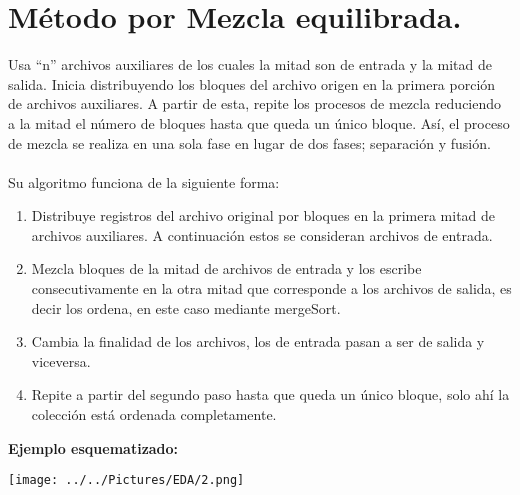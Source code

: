 \documentclass[12pt,letterpaper]{report}
\begin{document}
\section*{Método por Mezcla equilibrada.}
Usa “n” archivos auxiliares de los cuales la mitad son de entrada y la mitad de salida. Inicia distribuyendo los bloques del archivo origen en la primera porción de archivos auxiliares. A partir de esta, repite los procesos de mezcla reduciendo a la mitad el número de bloques hasta que queda un único bloque. 
Así, el proceso de mezcla se realiza en una sola fase en lugar de dos fases; separación y fusión.\\\\
Su algoritmo funciona de la siguiente forma:
\begin{enumerate}
	\item Distribuye registros del archivo original por bloques en la primera mitad de archivos auxiliares. A continuación estos se consideran archivos de entrada.
	\item Mezcla bloques de la mitad de archivos de entrada y los escribe consecutivamente en la otra mitad que corresponde a los archivos de salida, es decir los ordena, en este caso mediante mergeSort.
	\item Cambia la finalidad de los archivos, los de entrada pasan a ser de salida y viceversa.
	\item Repite a partir del segundo paso hasta que queda un único bloque, solo ahí la colección está ordenada completamente.
\end{enumerate}
\textbf{Ejemplo esquematizado:}\\
\begin{center}
\texttt{[image: ../../Pictures/EDA/2.png]} 
\end{center} 
\end{document}
